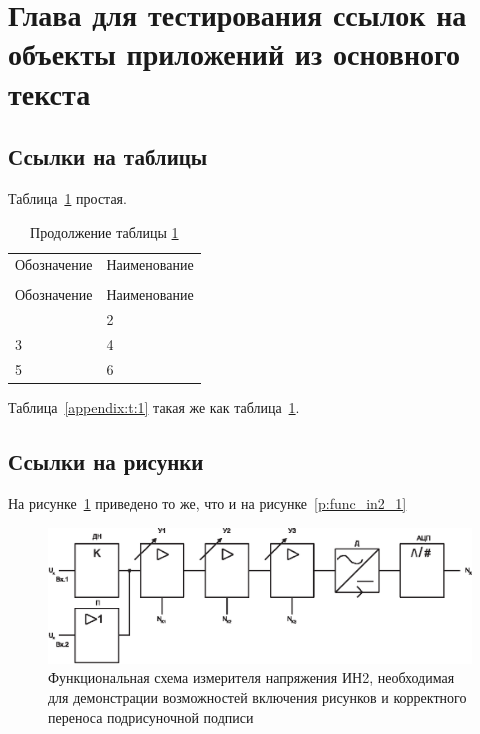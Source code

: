 \section{Глава для тестирования ссылок на объекты приложений из основного текста}

\subsection{Ссылки на таблицы}

Таблица~\ref{t_main:1} простая.

\begin{longtable}{|p{60mm}|p{100mm}|}
  \caption{Простая} \label{t_main:1} \\
  \hline
  \multicolumn{1}{|p{60mm}|}{\centering Обозначение} &
  \multicolumn{1}{p{100mm}|}{\centering Наименование} \\\hhline{|==|}
  \endfirsthead
  \caption*{Продолжение таблицы \ref{t_main:1}} \\
 \hline
  \multicolumn{1}{|p{60mm}|}{\centering Обозначение} &
  \multicolumn{1}{p{100mm}|}{\centering Наименование} \\\hhline{|==|}
  \endhead
   1    &   2   \\ \hline
   3    &   4   \\ \hline
   5    &   6   \\ \hline
\end{longtable}

Таблица~\ref{appendix:t:1} такая же как таблица~\ref{t_main:1}.




\subsection{Ссылки на рисунки}

На рисунке~\ref{p:func_in2_1_main} приведено то же, что и на рисунке~\ref{p:func_in2_1}

\begin{figure}[!h]
  \includegraphics[width=1\textwidth]{./about/func_in}
  \caption{Функциональная схема измерителя напряжения ИН2, необходимая для демонстрации возможностей включения рисунков и корректного переноса подрисуночной подписи}
  \label{p:func_in2_1_main}
\end{figure}



